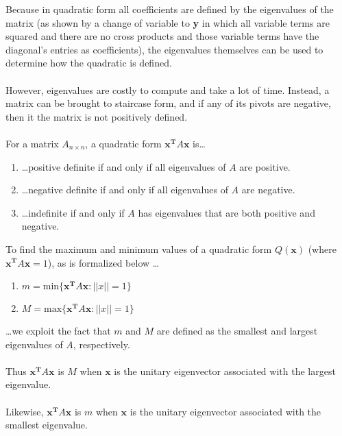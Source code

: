 \documentclass[12pt]{article}
\newcommand{\bt}[1]{\textbf{{#1}}}
\newcommand{\bm}[1]{\mathbf{{#1}}}
\newcommand{\set}[1]{\{{#1}\}}
\newcommand{\norm}[1]{||{#1}||}
\begin{document}
Because in quadratic form all coefficients are defined by the eigenvalues of the matrix
(as shown by a change of variable to \bt{y} in which all variable terms are squared and there are no cross products
and those variable terms have the diagonal's entries as coefficients),
the eigenvalues themselves can be used to determine how the quadratic is defined. \\ \\

However, eigenvalues are costly to compute and take a lot of time. Instead, a matrix
can be brought to staircase form, and if any of its pivots are negative, then it
the matrix is not positively defined. \\ \\

For a matrix $A_{n \times n}$, a quadratic form $\bm{x^T}A\bm{x}$ is\dots

\begin{enumerate}
    \item \dots positive definite if and only if all eigenvalues of $A$ are positive.
    \item \dots negative definite if and only if all eigenvalues of $A$ are negative.
    \item \dots indefinite if and only if $A$ has eigenvalues that are both positive and negative.
\end{enumerate}

To find the maximum and minimum values of a quadratic form $Q(\bm{x})$ (where $\bm{x^T}A\bm{x} = 1$),
as is formalized below \dots

\begin{enumerate}
    \item $m = \textrm{min}\set{\bm{x^T}A\bm{x}: \norm{x} = 1}$
    \item $M = \textrm{max}\set{\bm{x^T}A\bm{x}: \norm{x} = 1}$
\end{enumerate}

\dots we exploit the fact that $m$ and $M$ are defined as the smallest and largest eigenvalues
of $A$, respectively. \\ \\

Thus $\bm{x^T}A\bm{x}$ is $M$ when $\bm{x}$ is the unitary eigenvector
associated with the largest eigenvalue. \\ \\

Likewise, $\bm{x^T}A\bm{x}$ is $m$ when $\bm{x}$ is the unitary eigenvector
associated with the smallest eigenvalue. \\ \\
\end{document}
